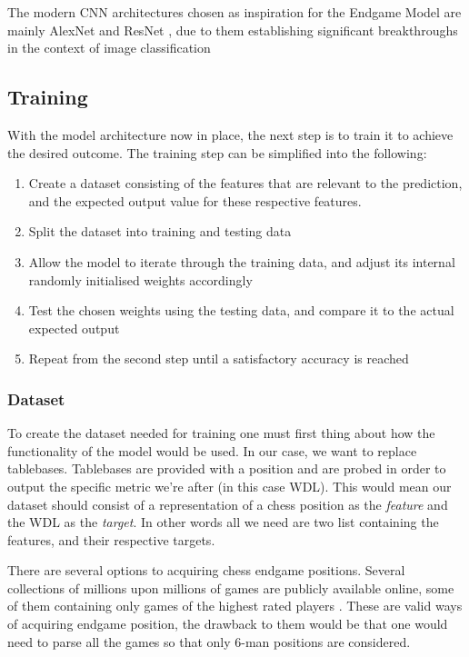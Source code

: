 The modern CNN architectures chosen as inspiration for the Endgame Model are mainly AlexNet \cite{krizhevskyAlexNet} and ResNet \cite{heResNet}, due to them establishing significant breakthroughs in the context of image classification \cite{ImageNet}

\subsection{Training}
With the model architecture now in place, the next step is to train it to achieve the desired outcome. The training step can be simplified into the following:

\begin{enumerate}
    \item Create a dataset consisting of the features that are relevant to the prediction, and the expected output value for these respective features.
    \item Split the dataset into training and testing data
    \item Allow the model to iterate through the training data, and adjust its internal randomly initialised weights accordingly
    \item Test the chosen weights using the testing data, and compare it to the actual expected output
    \item Repeat from the second step until a satisfactory accuracy is reached
\end{enumerate}

\subsubsection{Dataset}
To create the dataset needed for training one must first thing about how the functionality of the model would be used. In our case, we want to replace tablebases. Tablebases are provided with a position and are probed in order to output the specific metric we're after (in this case WDL). This would mean our dataset should consist of a representation of a chess position as the \textit{feature} and the WDL as the \textit{target}. In other words all we need are two list containing the features, and their respective targets.

There are several options to acquiring chess endgame positions. Several collections of millions upon millions of games are publicly available online, some of them containing only games of the highest rated players \cite{liDB}\cite{liEliteDB}. These are valid ways of acquiring endgame position, the drawback to them would be that one would need to parse all the games so that only 6-man positions are considered.

